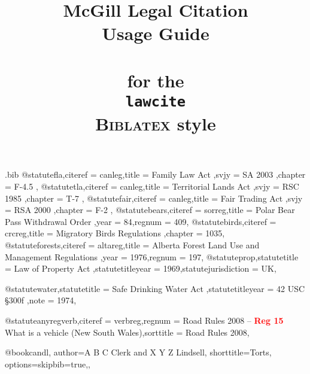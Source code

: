 \begin{filecontents*}[overwrite]{\jobname.bib}
@statute{fla,citeref = {canleg},title = {Family Law Act },svjy = {SA 2003 },chapter = {F-4.5 },}
@statute{tla,citeref = {canleg},title = {Territorial Lands Act },svjy = {RSC 1985 },chapter = {T-7 },}
@statute{fair,citeref = {canleg},title = {Fair Trading Act },svjy = {RSA 2000 },chapter = {F-2 },}
@statute{bears,citeref = {sorreg},title = {Polar Bear Pass Withdrawal Order },year = {84},regnum = {409},}
@statute{birds,citeref = {crcreg},title = {Migratory Birds Regulations },chapter = {1035},}
@statute{forests,citeref = {altareg},title = {Alberta Forest Land Use and Management Regulations },year = {1976},regnum = {197},}
@statute{prop,statutetitle = {Law of Property Act },statutetitleyear = {1969},statutejurisdiction = {UK},}

@statute{water,statutetitle = {Safe Drinking Water Act },statutetitleyear = {42 USC §300f },note = {1974},}

@statute{anyregverb,citeref = {verbreg},regnum = {Road Rules 2008 -- \textcolor{red}{\textbf{Reg 15}} What is a vehicle (New South Wales)},sorttitle = {Road Rules 2008},}

@book{candl,
author={A B C Clerk and X Y Z Lindsell},
shorttitle={Torts},
options={skipbib=true,},
}

\end{filecontents*}




\documentclass[12pt]{article}
\newcommand\rulesep{\rule{0.4\textwidth}{.4pt}}

\title{McGill Legal Citation\\Usage Guide\\ \ \\{\normalsize for  the\\  \texttt{lawcite}\\  \textsc{Biblatex} style}}
\author{}
\date{}
\long\gdef{}
\usepackage[table]{xcolor}
\pagecolor{blue!3}
\usepackage{fontspec}
\setmainfont{Noto Serif}
\setsansfont{TeX Gyre Adventor}[Scale=1.2]%
\setmonofont{Noto Sans Mono}%
\newfontface{}[Colour=blue]
\newcommand\circnum[1]{{\fcircnum#1}}
\usepackage[british]{babel}
\usepackage{csquotes}
\usepackage{graphicx}

\usepackage{marginnote}
\usepackage{abstract}
\usepackage{microtype}
\usepackage{minitoc}
\dosecttoc
\usepackage{etoolbox}


